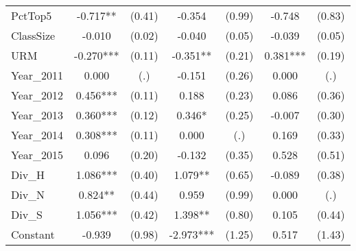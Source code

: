 \begin{sidewaystable}[htb]
\begin{threeparttable}
\begin{tabular}{l|c|c|c|c|c|c}
      PctTop5           & -0.717**                     & (0.41)                       & -0.354               & (0.99)               & -0.748               & (0.83)               \\
      ClassSize         & -0.010                       & (0.02)                       & -0.040               & (0.05)               & -0.039               & (0.05)               \\
      URM               & -0.270***                    & (0.11)                       & -0.351**             & (0.21)               & 0.381***             & (0.19)               \\
      Year\_2011        & 0.000                        & (.)                          & -0.151               & (0.26)               & 0.000                & (.)                  \\
      Year\_2012        & 0.456***                     & (0.11)                       & 0.188                & (0.23)               & 0.086                & (0.36)               \\
      Year\_2013        & 0.360***                     & (0.12)                       & 0.346*               & (0.25)               & -0.007               & (0.30)               \\
      Year\_2014        & 0.308***                     & (0.11)                       & 0.000                & (.)                  & 0.169                & (0.33)               \\
      Year\_2015        & 0.096                        & (0.20)                       & -0.132               & (0.35)               & 0.528                & (0.51)               \\
      Div\_H            & 1.086***                     & (0.40)                       & 1.079**              & (0.65)               & -0.089               & (0.38)               \\
      Div\_N            & 0.824**                      & (0.44)                       & 0.959                & (0.99)               & 0.000                & (.)                  \\
      Div\_S            & 1.056***                     & (0.42)                       & 1.398**              & (0.80)               & 0.105                & (0.44)               \\
      Constant          & -0.939                       & (0.98)                       & -2.973***            & (1.25)               & 0.517                & (1.43)               \\

\end{tabular}
\end{threeparttable}
\end{sidewaystable}
